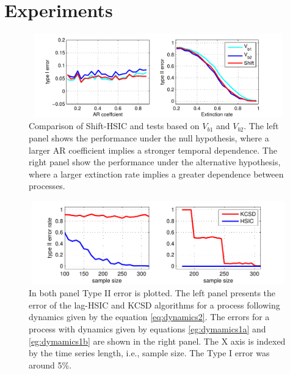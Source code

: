 \section{Experiments}
\label{sec:Experiments}



\begin{figure}
\centering  
\includegraphics[width=397.5pt,height=102.5pt]{./arExtinct.pdf}
\caption{Comparison of Shift-HSIC and tests based on $V_{b1}$ and $V_{b2}$. The left panel shows the performance under the null hypothesis, where a larger AR coefficient implies a stronger temporal dependence. The right panel show the performance under the alternative hypothesis, where a larger extinction rate implies a greater dependence between processes.}
\label{fig:arExtinct}
\end{figure}

\begin{figure}
\centering  
\includegraphics[width=397.5pt,height=102.5pt]{./varAndPhase.pdf}
\caption{In both panel Type II error is plotted. The left panel presents the error of the lag-HSIC and KCSD algorithms for a process following dynamics given by the equation \eqref{eq:dynamics2}.  The errors for a process with dynamics given by equations \eqref{eg:dymamics1a} and \eqref{eg:dymamics1b} are shown in the right panel. The X axis is indexed by the time series length, i.e., sample size. The Type I error was around 5\%.}
\label{fig:phaseAndVar}
\end{figure}

\vspace{-4mm}
